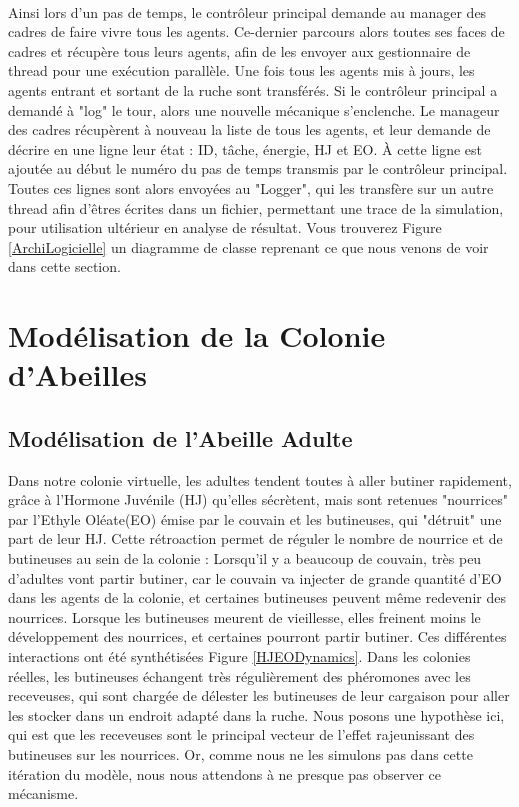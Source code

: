 			
			\paragraph{}
			Ainsi lors d'un pas de temps, le contrôleur principal demande au manager des cadres de faire vivre tous les agents. Ce-dernier parcours alors toutes ses faces de cadres et récupère tous leurs agents, afin de les envoyer aux gestionnaire de thread pour une exécution parallèle. Une fois tous les agents mis à jours, les agents entrant et sortant de la ruche sont transférés. Si le contrôleur principal a demandé à "log" le tour, alors une nouvelle mécanique s'enclenche. Le manageur des cadres récupèrent à nouveau la liste de tous les agents, et leur demande de décrire en une ligne leur état : ID, tâche, énergie, HJ et EO. À cette ligne est ajoutée au début le numéro du pas de temps transmis par le contrôleur principal. Toutes ces lignes sont alors envoyées au "Logger", qui les transfère sur un autre thread afin d'êtres écrites dans un fichier, permettant une trace de la simulation, pour utilisation ultérieur en analyse de résultat. Vous trouverez Figure \ref{ArchiLogicielle} un diagramme de classe reprenant ce que nous venons de voir dans cette section.

	\section{Modélisation de la Colonie d'Abeilles}
		\subsection{Modélisation de l'Abeille Adulte}
		
		Dans notre colonie virtuelle, les adultes tendent toutes à aller butiner rapidement, grâce à l'Hormone Juvénile (HJ) qu'elles sécrètent, mais sont retenues "nourrices" par l'Ethyle Oléate(EO) émise par le couvain et les butineuses, qui "détruit" une part de leur HJ. Cette rétroaction permet de réguler le nombre de nourrice et de butineuses au sein de la colonie : Lorsqu'il y a beaucoup de couvain, très peu d'adultes vont partir butiner, car le couvain va injecter de grande quantité d'EO dans les agents de la colonie, et certaines butineuses peuvent même redevenir des nourrices. Lorsque les butineuses meurent de vieillesse, elles freinent moins le développement des nourrices, et certaines pourront partir butiner. Ces différentes interactions ont été synthétisées Figure \ref{HJEODynamics}. Dans les colonies réelles, les butineuses échangent très régulièrement des phéromones avec les receveuses, qui sont chargée de délester les butineuses de leur cargaison pour aller les stocker dans un endroit adapté dans la ruche. Nous posons une hypothèse ici, qui est que les receveuses sont le principal vecteur de l'effet rajeunissant des butineuses sur les nourrices. Or, comme nous ne les simulons pas dans cette itération du modèle, nous nous attendons à ne presque pas observer ce mécanisme.
		
